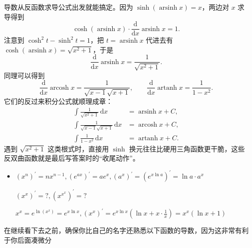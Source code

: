 \documentclass[lang=cn,newtx,10pt,scheme=chinese]{elegantbook}
\DeclareMathOperator{\arsinh}{arsinh}
\DeclareMathOperator{\arcosh}{arcosh}
\DeclareMathOperator{\artanh}{artanh}
\begin{document}
\begin{example}
  导数从反函数求导公式出发就能搞定。因为 $\sinh(\arsinh x)=x$，两边对 $x$ 求导得到
  \begin{equation*}
    \cosh(\arsinh x) \cdot \frac{\mathrm{d}}{\mathrm{d}x}\arsinh x = 1.
  \end{equation*}
  注意到 $\cosh^{2} t - \sinh^{2} t = 1$，把 $t=\arsinh x$ 代进去有 $\cosh(\arsinh x)=\sqrt{x^{2}+1}$，于是
  \begin{equation*}
    \frac{\mathrm{d}}{\mathrm{d}x}\arsinh x = \frac{1}{\sqrt{x^{2}+1}}.
  \end{equation*}
  同理可以得到
  \begin{equation*}
    \frac{\mathrm{d}}{\mathrm{d}x}\arcosh x = \frac{1}{\sqrt{x-1}\sqrt{x+1}}, \qquad
    \frac{\mathrm{d}}{\mathrm{d}x}\artanh x = \frac{1}{1-x^{2}}.
  \end{equation*}
  它们的反过来积分公式就顺理成章：
  \begin{align}
    \int \frac{1}{\sqrt{x^{2}+1}}\,\mathrm{d}x &= \arsinh x + C, \\
    \int \frac{1}{\sqrt{x-1}\sqrt{x+1}}\,\mathrm{d}x &= \arcosh x + C, \\
    \int \frac{1}{1-x^{2}}\,\mathrm{d}x &= \artanh x + C.
  \end{align}
  遇到 $\sqrt{x^{2}+1}$ 这类根式时，直接用 $\sinh$ 换元往往比硬用三角函数更干脆，这些反双曲函数就是最后写答案时的“收尾动作”。
\end{example}

\begin{itemize}
  \item $(x^{n})^{\prime }=n x^{n-1},(e^{ax})^{\prime }=ae^{x},(a^{x})^{\prime }=(e^{x\ln a})^{\prime }=\ln a \cdot  a^{x}$
  \begin{problem}
    $(x^{x})^{\prime }=?,(x^{x^{x}})^{\prime }=?$
  \end{problem}
  \begin{solution}
    $x^{x}=e^{\ln(x^{x})}=e^{x\ln x},(x^{x})^{\prime }=e^{x \ln x}(\ln x+x\cdot \frac{1}{x})=x^{x}(\ln x+1)$
  \end{solution}
\end{itemize}

在继续看下去之前，确保你比自己的名字还熟悉以下函数的导数，因为这非常有利于你后面凑微分
\end{document}
